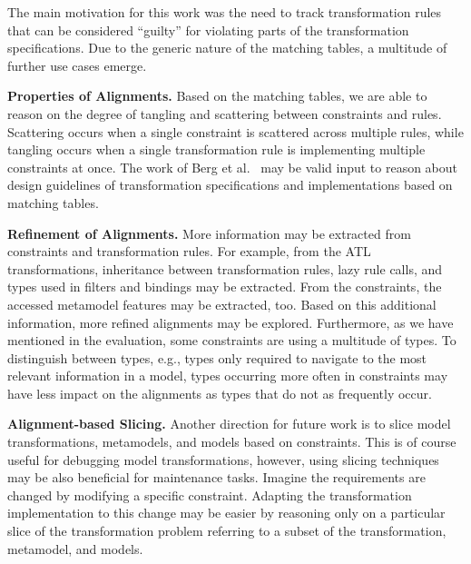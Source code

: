 The main motivation for this work was the need to track transformation rules that can be considered ``guilty'' for violating parts of the transformation specifications. Due to the generic nature of the matching tables, a multitude of further use cases emerge.

\textbf{Properties of Alignments.} Based on the matching tables, we are able to reason on the degree of tangling and scattering between constraints and rules. Scattering occurs when a single constraint is scattered across multiple rules, while tangling occurs when a single transformation rule is implementing multiple constraints at once. The work of Berg et al.~\cite{BergCH07} may be valid input to reason about design guidelines of transformation specifications and implementations based on matching tables.

\textbf{Refinement of Alignments.} More information may be extracted from constraints and transformation rules. For example, from the ATL transformations, inheritance between transformation rules, lazy rule calls, and types used in filters and bindings may be extracted. From the constraints, the accessed metamodel features may be extracted, too. Based on this additional information, more refined alignments may be explored. Furthermore, as we have mentioned in the evaluation, some constraints are using a multitude of types. To distinguish between types, e.g., types only required to navigate to the most relevant information in a model, types occurring more often in constraints may have less impact on the alignments as types that do not as frequently occur.

\textbf{Alignment-based Slicing.} Another direction for future work is to slice model transformations, metamodels, and models based on constraints. This is of course useful for debugging model transformations, however, using slicing techniques may be also beneficial for maintenance tasks. Imagine the requirements are changed by modifying a specific constraint. Adapting the transformation implementation to this change may be easier by reasoning only on a particular slice of the transformation problem referring to a subset of the transformation, metamodel, and models.
